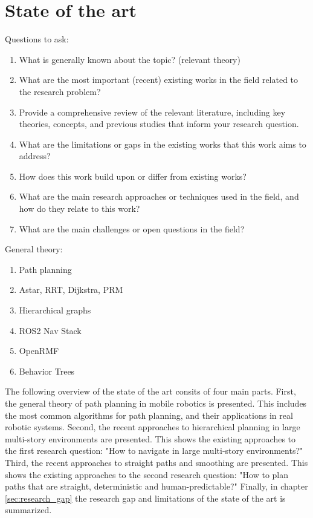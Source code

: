 \chapter{State of the art}
\label{sec:state_of_the_art}
Questions to ask:
\begin{enumerate}
    \item What is generally known about the topic? (relevant theory)
    \item What are the most important (recent) existing works in the field related to the research problem? 
    \item Provide a comprehensive review of the relevant literature, including key theories, concepts, and previous studies that inform your research question.
    \item What are the limitations or gaps in the existing works that this work aims to address? 
    \item How does this work build upon or differ from existing works? 
    \item What are the main research approaches or techniques used in the field, and how do they relate to this work? 
    \item What are the main challenges or open questions in the field? 
\end{enumerate}

General theory:
\begin{enumerate}
    \item Path planning
    \item Astar, RRT, Dijkstra, PRM
    \item Hierarchical graphs
    \item ROS2 Nav Stack
    \item OpenRMF
    \item Behavior Trees
\end{enumerate}

The following overview of the state of the art consits of four main parts. First, the general theory of path planning in mobile robotics is presented. This includes the most common algorithms for path planning, and their applications in real robotic systems. Second, the recent approaches to hierarchical planning in large multi-story environments are presented. This shows the existing approaches to the first research question: "How to navigate in large multi-story environments?" Third, the recent approaches to straight paths and smoothing are presented. This shows the existing approaches to the second research question: "How to plan paths that are straight, deterministic and human-predictable?" Finally, in chapter \ref*{sec:research_gap} the research gap and limitations of the state of the art is summarized.

